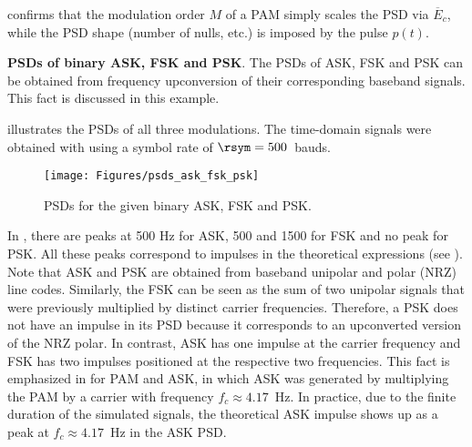  confirms that the modulation order $M$ of a PAM simply scales the
PSD via $\overline E_c$, while the PSD shape (number of nulls, etc.) is imposed by the pulse
$p(t)$.
\eExample

\bExample \textbf{PSDs of binary ASK, FSK and PSK}.
The PSDs of ASK, FSK and PSK can be obtained from frequency upconversion of their corresponding 
baseband signals. This fact is discussed in this example.


 illustrates the PSDs of all three modulations. The time-domain
signals were obtained with  using a symbol rate
of $\rsym=500$~bauds. 

\begin{figure}[htbp]
\centering
\texttt{[image: Figures/psds\_ask\_fsk\_psk]}
\caption[{PSDs for the given binary ASK, FSK and PSK.}]{PSDs for the given binary ASK, FSK and PSK.\label{fig:psds_ask_fsk_psk}}
\end{figure}


In , there are peaks at 500 Hz for ASK, 500 and 1500 for FSK and no peak for PSK. All these peaks correspond to impulses in the theoretical expressions (see ).
Note that ASK and PSK are obtained from baseband unipolar and polar (NRZ) line codes.
Similarly, the FSK can be seen as the sum of two unipolar signals that were previously multiplied
by distinct carrier frequencies.
Therefore, a PSK does not have an impulse in its PSD because it corresponds to an 
upconverted version of the NRZ polar. In contrast, ASK has one impulse at the carrier frequency 
and FSK has two impulses positioned at the respective two frequencies.
This fact is emphasized in  for PAM and ASK, in which
ASK was generated by multiplying the PAM by a carrier with frequency $f_c \approx 4.17$~Hz.
In practice, due to the finite duration of the simulated signals, the theoretical ASK impulse 
shows up as a peak at $f_c \approx 4.17$~Hz in the ASK PSD.

